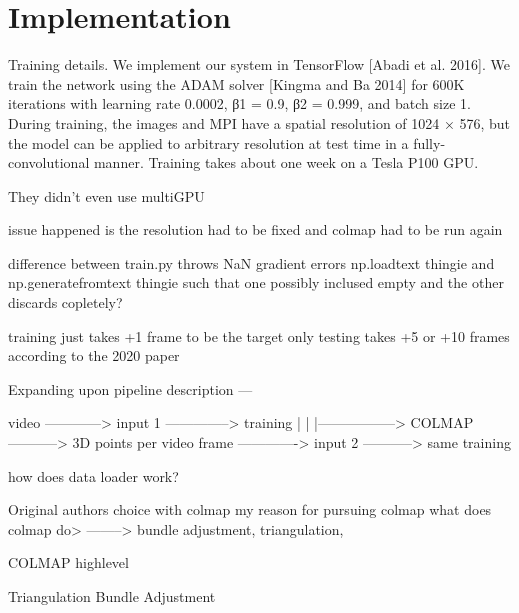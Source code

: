 \section{Implementation}\label{sec3:implementation} 

Training details. We implement our system in TensorFlow [Abadi
et al. 2016]. We train the network using the ADAM solver [Kingma
and Ba 2014] for 600K iterations with learning rate 0.0002, β1 =
0.9, β2 = 0.999, and batch size 1. During training, the images and
MPI have a spatial resolution of 1024 × 576, but the model can be
applied to arbitrary resolution at test time in a fully-convolutional
manner. Training takes about one week on a Tesla P100 GPU.

They didn't even use multiGPU

issue happened is the resolution had to be fixed and colmap had to be run again

difference between train.py throws NaN gradient errors np.loadtext thingie and np.generatefromtext thingie such that one possibly inclused empty and the other discards copletely?

training just takes +1 frame to be the target
only testing takes +5 or +10 frames according to the 2020 paper


Expanding upon pipeline description ---

video ------------> input 1 --------------> training
|
|
|-----------------> COLMAP -----------> 3D points per video frame -------------> input 2 -----------> same training

how does data loader work?

Original authors choice with colmap 
my reason for pursuing colmap
what does colmap do> --------> bundle adjustment, triangulation, 

COLMAP highlevel

Triangulation
Bundle Adjustment